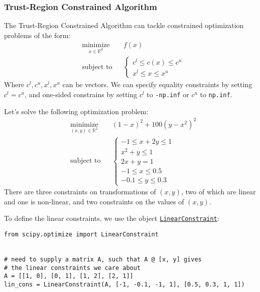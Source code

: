 \documentclass[12pt, a4paper]{article}
\begin{document}
\subsubsection{Trust-Region Constrained Algorithm}
\label{sec:org0e04726}
The Trust-Region Constrained Algorithm can tackle constrained optimization problems of the form:
\begin{equation*}
\begin{aligned}
& \underset{x\in\mathbb{R}^d}{\text{minimize}} & & f(x)\\
& \text{subject to} & & \begin{cases}
c^l \leq c(x) \leq c^u\\
x^l \leq x \leq x^u
\end{cases}
\end{aligned}
\end{equation*}
Where \(c^l, c^u, x^l, x^u\) can be vectors.
We can specify equality constraints by setting \(c^l=c^u\), and one-sided constrains by setting \(c^l\) to \texttt{-np.inf} or \(c^u\) to \texttt{np.inf}.

Let's solve the following optimization problem:
\begin{equation*}
\begin{aligned}
& \underset{(x, y)\in\mathbb{R}^2}{\text{minimize}} & & (1-x)^2 + 100(y-x^2)^2\\
& \text{subject to} & & \begin{cases}
-1 \leq x + 2y \leq 1\\
x^2 + y\leq 1\\
2x + y =1\\
-1 \leq x \leq 0.5\\
-0.1 \leq y \leq 0.3
\end{cases}
\end{aligned}
\end{equation*}
There are three constraints on transformations of \((x, y)\), two of which are linear and one is non-linear, and two constraints on the values of \((x, y)\).

To define the linear constraints, we use the object \href{https://docs.scipy.org/doc/scipy-1.3.0/reference/generated/scipy.optimize.LinearConstraint.html\#scipy.optimize.LinearConstraint}{\texttt{LinearConstraint}}:
\lstset{language=jupyter-python,label= ,caption= ,captionpos=b,numbers=none}
\begin{lstlisting}
from scipy.optimize import LinearConstraint


# need to supply a matrix A, such that A @ [x, y] gives
# the linear constraints we care about
A = [[1, 0], [0, 1], [1, 2], [2, 1]]
lin_cons = LinearConstraint(A, [-1, -0.1, -1, 1], [0.5, 0.3, 1, 1])
\end{lstlisting}
\end{document}
